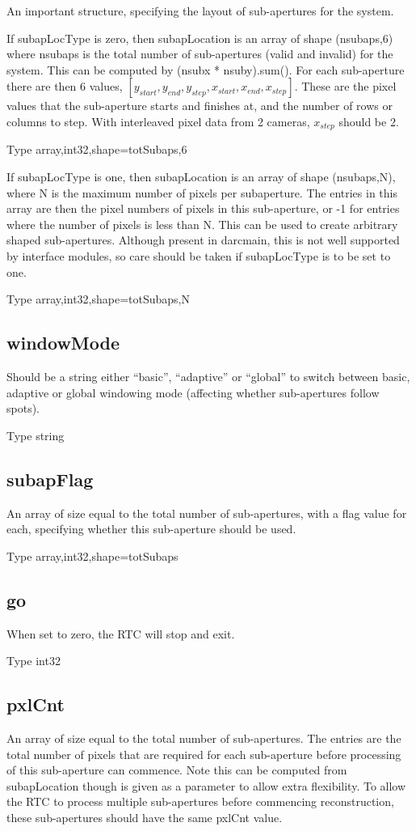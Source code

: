 \documentclass[a4,10pt]{article}
\begin{document}
An important structure, specifying the layout of sub-apertures for the
system.  

If subapLocType is zero, then subapLocation is an array of shape (nsubaps,6) where nsubaps is the
total number of sub-apertures (valid and invalid) for the system.
This can be computed by (nsubx * nsuby).sum().  For each sub-aperture
there are then 6 values,
$[y_{start},y_{end},y_{step},x_{start},x_{end},x_{step}]$.  These are
the pixel values that the sub-aperture starts and finishes at, and the
number of rows or columns to step.  With interleaved pixel data from 2
cameras, $x_{step}$ should be 2.  

Type array,int32,shape=totSubaps,6

If subapLocType is one, then subapLocation is an array of shape
(nsubaps,N), where N is the maximum number of pixels per subaperture.
The entries in this array are then the pixel numbers of pixels in this
sub-aperture, or -1 for entries where the number of pixels is less
than N.  This can be used to create arbitrary shaped sub-apertures.
Although present in darcmain, this is not well supported by interface
modules, so care should be taken if subapLocType is to be set to one.

Type array,int32,shape=totSubaps,N

\subsection{windowMode}
Should be a string either ``basic'', ``adaptive'' or ``global'' to
switch between basic, adaptive or global windowing mode (affecting
whether sub-apertures follow spots).

Type string

\subsection{subapFlag}
An array of size equal to the total number of sub-apertures, with a
flag value for each, specifying whether this sub-aperture should be
used.

Type array,int32,shape=totSubaps

\subsection{go}
When set to zero, the RTC will stop and exit.

Type int32

\subsection{pxlCnt}
An array of size equal to the total number of sub-apertures.  The
entries are the total number of pixels that are required for each
sub-aperture before processing of this sub-aperture can commence.
Note this can be computed from subapLocation though is given as a
parameter to allow extra flexibility.  To allow the RTC to process
multiple sub-apertures before commencing reconstruction, these
sub-apertures should have the same pxlCnt value.
\end{document}
